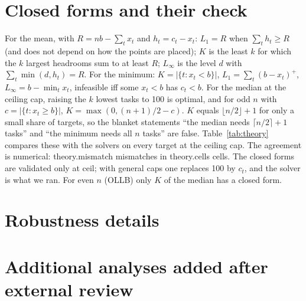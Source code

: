 \section{Closed forms and their check}\label{app:theory}
For the mean, with $R=nb-\sum_t x_t$ and $h_t=c_t-x_t$: $L_1=R$ when $\sum_t h_t\ge R$ (and does not depend on how the points are placed); $K$ is the least $k$ for which the $k$ largest headrooms sum to at least $R$; $L_\infty$ is the level $d$ with $\sum_t\min(d,h_t)=R$. For the minimum: $K=|\{t:x_t<b\}|$, $L_1=\sum_t(b-x_t)^+$, $L_\infty=b-\min_t x_t$, infeasible iff some $x_t<b$ has $c_t<b$. For the median at the ceiling cap, raising the $k$ lowest tasks to 100 is optimal, and for odd $n$ with $c=|\{t:x_t\ge b\}|$, $K=\max(0,(n+1)/2-c)$. $K$ equals $\lfloor n/2\rfloor+1$ for only a small share of targets, so the blanket statements ``the median needs $\lceil n/2\rceil+1$ tasks'' and ``the minimum needs all $n$ tasks'' are false. Table~\ref{tab:theory} compares these with the solvers on every target at the ceiling cap. The agreement is numerical: \num{theory.mismatch} mismatches in \num{theory.cells} cells. The closed forms are validated only at \textsf{ceil}; with general caps one replaces 100 by $c_t$, and the solver is what we ran. For even $n$ (OLLB) only $K$ of the median has a closed form.


\section{Robustness details}\label{app:robust}


\section{Additional analyses added after external review}\label{app:newanalyses}
